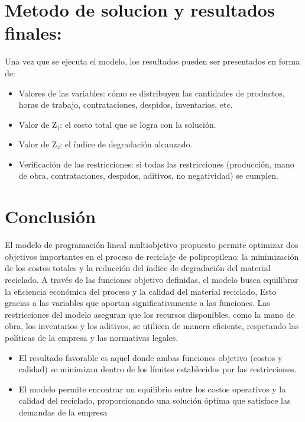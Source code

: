 \documentclass[a4paper,12pt]{article}
\begin{document}
\section*{Metodo de solucion y resultados finales:}
Una vez que se ejecuta el modelo, los resultados pueden ser presentados en forma de:
\begin{itemize}

\item Valores de las variables: cómo se distribuyen las cantidades de productos, horas de trabajo, contrataciones, despidos, inventarios, etc.

\item Valor de Z₁: el costo total que se logra con la solución.

\item Valor de Z₂: el índice de degradación alcanzado.
\item Verificación de las restricciones: si todas las restricciones (producción, mano de obra, contrataciones, despidos, aditivos, no negatividad) se cumplen.
\end{itemize}
\newpage
\section *{Conclusión}

El modelo de programación lineal multiobjetivo propuesto permite optimizar dos objetivos importantes en el proceso de reciclaje de polipropileno: la minimización de los costos totales y la reducción del índice de degradación del material reciclado. A través de las funciones objetivo definidas, el modelo busca equilibrar la eficiencia económica del proceso y la calidad del material reciclado,
Esto gracias a las variables que aportan significativamente a las funciones.
Las restricciones del modelo aseguran que los recursos disponibles, como la mano de obra, los inventarios y los aditivos, se utilicen de manera eficiente, respetando las políticas de la empresa y las normativas legales. 
\begin{itemize}
\item El resultado favorable es aquel donde ambas funciones objetivo (costos y calidad) se minimizan dentro de los límites establecidos por las restricciones.

\item El modelo permite encontrar un equilibrio entre los costos operativos y la calidad del reciclado, proporcionando una solución óptima que satisface las demandas de la empresa
\end{itemize}
\end{document}
